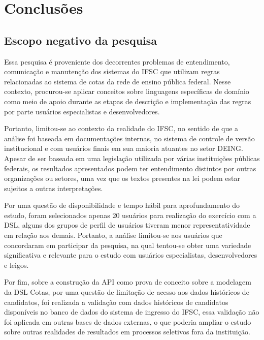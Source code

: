 \chapter{Conclusões}
\label{chap:consideracoes}



\section{Escopo negativo da pesquisa}
\label{escoponegativo}

Essa pesquisa é proveniente dos decorrentes problemas de entendimento, comunicação e manutenção dos sistemas do \gls{IFSC} que utilizam regras relacionadas ao sistema de cotas da rede de ensino pública federal. Nesse contexto, procurou-se aplicar conceitos sobre linguagens específicas de domínio como meio de apoio durante as etapas de descrição e implementação das regras por parte usuários especialistas e desenvolvedores. 

Portanto, limitou-se ao contexto da realidade do \gls{IFSC}, no sentido de que a análise foi baseada em documentações internas, no sistema de controle de versão institucional e com usuários finais em sua maioria atuantes no setor \gls{DEING}. Apesar de ser baseada em uma legislação utilizada por várias instituições públicas federais, os resultados apresentados podem ter entendimento distintos por outras organizações ou setores, uma vez que os textos presentes na lei podem estar sujeitos a outras interpretações. 

Por uma questão de disponibilidade e tempo hábil para aprofundamento do estudo, foram selecionados apenas 20 usuários para realização do exercício com a DSL, alguns dos grupos de perfil de usuários tiveram menor representatividade em relação aos demais. Portanto, a análise limitou-se aos usuários que concordaram em participar da pesquisa, na qual tentou-se obter uma variedade significativa e relevante para o estudo com usuários especialistas, desenvolvedores e leigos.

Por fim, sobre a construção da API como prova de conceito sobre a modelagem da DSL Cotas, por uma questão de limitação de acesso aos dados históricos de candidatos, foi realizada a validação com dados históricos de candidatos disponíveis no banco de dados do sistema de ingresso do \gls{IFSC}, essa validação não foi aplicada em outras bases de dados externas, o que poderia ampliar o estudo sobre outras realidades de resultados em processos seletivos fora da instituição.

